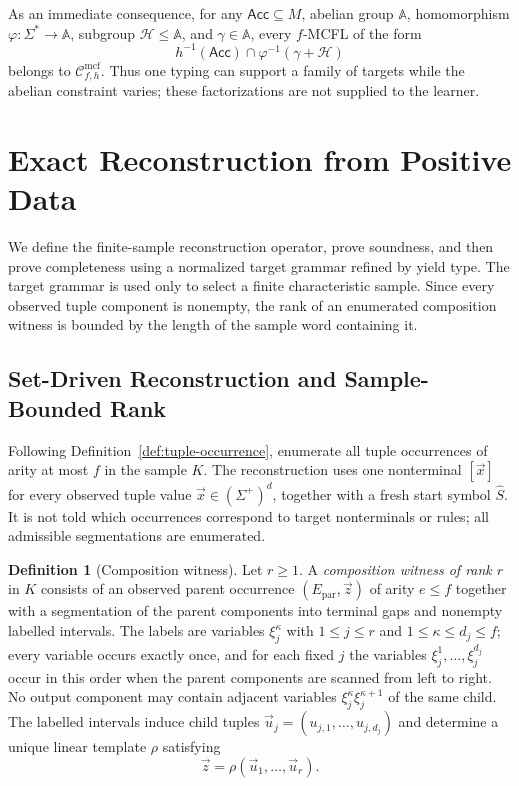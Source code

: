 \documentclass[11pt]{article}
\numberwithin{equation}{section}
\theoremstyle{plain}
\theoremstyle{definition}
\newtheorem{definition}[theorem]{Definition}
\theoremstyle{remark}
\newcommand{\Cmcf}[2]{\mathcal{C}^{\mathrm{mcf}}_{#1,#2}}
\newcommand{\tuple}[1]{\vec{#1}}
\begin{document}
As an immediate consequence, for any $\mathsf{Acc}\subseteq M$, abelian group
$\mathbb A$, homomorphism $\varphi:\Sigma^*\to\mathbb A$, subgroup
$\mathcal H\le\mathbb A$, and $\gamma\in\mathbb A$, every $f$-MCFL of the
form
\[
 h^{-1}(\mathsf{Acc})\cap\varphi^{-1}(\gamma+\mathcal H)
\]
belongs to $\Cmcf{f}{h}$.  Thus one typing can support a family of targets
while the abelian constraint varies; these factorizations are not supplied to
the learner.

\section{Exact Reconstruction from Positive Data}
\label{sec:learner}

We define the finite-sample reconstruction operator, prove soundness, and then
prove completeness using a normalized target grammar refined by yield type.
The target grammar is used only to select a finite characteristic sample.
Since every observed tuple component is nonempty, the rank of an enumerated
composition witness is bounded by the length of the sample word containing it.

\subsection{Set-Driven Reconstruction and Sample-Bounded Rank}


Following Definition~\ref{def:tuple-occurrence}, enumerate all tuple occurrences
of arity at most $f$ in the sample $K$.  The reconstruction uses one nonterminal
$[\tuple x]$ for every observed tuple value $\tuple x\in(\Sigma^+)^d$, together
with a fresh start symbol $\widehat S$.  It is not told which occurrences
correspond to target nonterminals or rules; all admissible segmentations are
enumerated.

\begin{definition}[Composition witness]
\label{def:composition-witness}
Let $r\ge1$.  A \emph{composition witness of rank $r$} in $K$ consists of an
observed parent occurrence $(E_{\mathrm{par}},\tuple z)$ of arity $e\le f$ together with a
segmentation of the parent components into terminal gaps and nonempty labelled
intervals.  The labels are variables $\xi_j^{\kappa}$ with
$1\le j\le r$ and $1\le\kappa\le d_j\le f$; every variable occurs exactly once,
and for each fixed $j$ the variables
$\xi_j^1,\ldots,\xi_j^{d_j}$ occur in this order when the parent components are
scanned from left to right.  No output component may contain adjacent variables
$\xi_j^{\kappa}\xi_j^{\kappa+1}$ of the same child.  The labelled intervals
induce child tuples $\tuple u_j=(u_{j,1},\ldots,u_{j,d_j})$ and determine a
unique linear template $\rho$ satisfying
\[
  \tuple z=\rho(\tuple u_1,\ldots,\tuple u_r).
\]
\end{definition}
\end{document}
